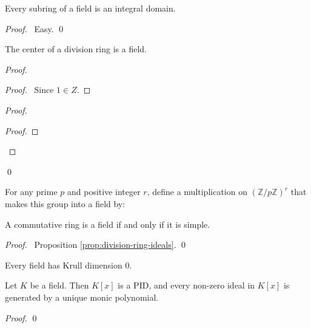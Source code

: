 
\begin{prop}
Every subring of a field is an integral domain.
\end{prop}

\begin{proof}
\pf\ Easy. \qed
\end{proof}

\begin{prop}
The center of a division ring is a field.
\end{prop}

\begin{proof}
\pf
{}
\begin{proof}
\pf\ Since $1 \in Z$.
\end{proof}
\begin{proof}
	\begin{proof}
	\end{proof}
\end{proof}
\qed
\end{proof}

\begin{df}
For any prime $p$ and positive integer $r$, define a multiplication on $(\mathbb{Z} / p \mathbb{Z})^r$ that makes this group into a field by:
\end{df}

\begin{prop}
A commutative ring is a field if and only if it is simple.
\end{prop}

\begin{proof}
\pf\ Proposition \ref{prop:division-ring-ideals}. \qed
\end{proof}

\begin{cor}
Every field has Krull dimension 0.
\end{cor}

\begin{prop}
Let $K$ be a field. Then $K[x]$ is a PID, and every non-zero ideal in $K[x]$ is generated by a unique monic polynomial.
\end{prop}

\begin{proof}
\pf
{}
\qed
\end{proof}

